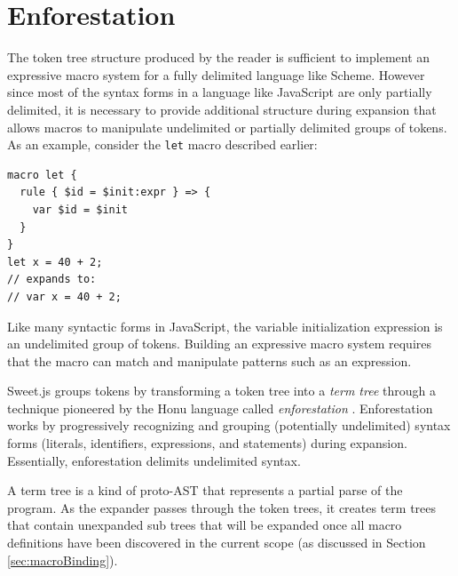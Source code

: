 \documentclass[preprint,10pt]{sigplanconf}
\begin{document}
\section{Enforestation}
\label{sec:enforest}

The token tree structure produced by the reader is sufficient to
implement an expressive macro system for a fully delimited language
like Scheme. However since most of the syntax forms in a language like
JavaScript are only partially delimited, it is necessary to provide
additional structure during expansion that allows macros to manipulate
undelimited or partially delimited groups of tokens. As an example,
consider the \verb!let! macro described earlier:

\begin{lstlisting}
macro let {
  rule { $id = $init:expr } => {
    var $id = $init
  }
}
let x = 40 + 2;
// expands to:
// var x = 40 + 2;
\end{lstlisting}

Like many syntactic forms in JavaScript, the variable initialization
expression is an undelimited group of tokens. Building an expressive
macro system requires that the macro can match and manipulate patterns
such as an expression.

Sweet.js groups tokens by transforming a token tree into a \emph{term
  tree} through a technique pioneered by the Honu language called
\emph{enforestation} \cite{Rafkind2013}. Enforestation works by
progressively recognizing and grouping (potentially undelimited)
syntax forms (\eg literals, identifiers, expressions, and statements)
during expansion. Essentially, enforestation delimits undelimited
syntax.

A term tree is a kind of proto-AST that represents a partial parse of
the program. As the expander passes through the token trees, it
creates term trees that contain unexpanded sub trees that will be
expanded once all macro definitions have been discovered in the
current scope (as discussed in Section \ref{sec:macroBinding}).
\end{document}
